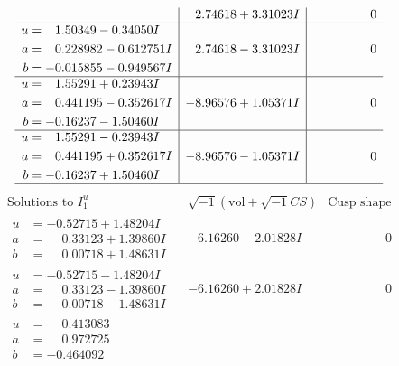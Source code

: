 \documentclass[1p]{elsarticle_modified}
\theoremstyle{definition}
\newcommand{\I}{\sqrt{-1}}
\begin{document}
$$\begin{array}{c|c|c}
 & \phantom{-}2.74618 + 3.31023 I & \phantom{-0.000000 } 0 \\ \hline\begin{aligned}
u &= \phantom{-}1.50349 - 0.34050 I \\
a &= \phantom{-}0.228982 - 0.612751 I \\
b &= -0.015855 - 0.949567 I\end{aligned}
 & \phantom{-}2.74618 - 3.31023 I & \phantom{-0.000000 } 0 \\ \hline\begin{aligned}
u &= \phantom{-}1.55291 + 0.23943 I \\
a &= \phantom{-}0.441195 - 0.352617 I \\
b &= -0.16237 - 1.50460 I\end{aligned}
 & -8.96576 + 1.05371 I & \phantom{-0.000000 } 0 \\ \hline\begin{aligned}
u &= \phantom{-}1.55291 - 0.23943 I \\
a &= \phantom{-}0.441195 + 0.352617 I \\
b &= -0.16237 + 1.50460 I\end{aligned}
 & -8.96576 - 1.05371 I & \phantom{-0.000000 } 0\\
 \hline 
 \end{array}$$\newpage$$\begin{array}{c|c|c}  
\text{Solutions to }I^u_{1}& \I (\text{vol} + \sqrt{-1}CS) & \text{Cusp shape}\\
 \hline 
\begin{aligned}
u &= -0.52715 + 1.48204 I \\
a &= \phantom{-}0.33123 + 1.39860 I \\
b &= \phantom{-}0.00718 + 1.48631 I\end{aligned}
 & -6.16260 - 2.01828 I & \phantom{-0.000000 } 0 \\ \hline\begin{aligned}
u &= -0.52715 - 1.48204 I \\
a &= \phantom{-}0.33123 - 1.39860 I \\
b &= \phantom{-}0.00718 - 1.48631 I\end{aligned}
 & -6.16260 + 2.01828 I & \phantom{-0.000000 } 0 \\ \hline\begin{aligned}
u &= \phantom{-}0.413083\phantom{ +0.000000I} \\
a &= \phantom{-}0.972725\phantom{ +0.000000I} \\
b &= -0.464092\phantom{ +0.000000I}\end{aligned}

\end{array}$$
\end{document}
